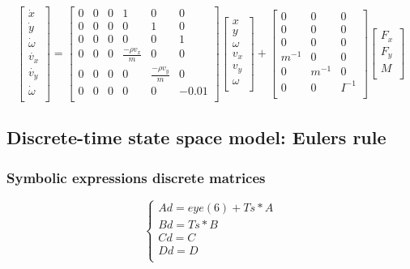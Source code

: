 \begin{equation}
\begin{bmatrix}
\dot{x} \\
\dot{y} \\
\dot{\omega} \\
\dot{v_x} \\
\dot{v_y} \\
\dot{\omega} \\
\end{bmatrix}
=
\begin{bmatrix}
0 & 0 & 0 & 1 & 0 & 0 \\
0 & 0 & 0 & 0 & 1 & 0 \\
0 & 0 & 0 & 0 & 0 & 1 \\
0 & 0 & 0 & \frac{-\rho v_x}{m} & 0 & 0 \\
0 & 0 & 0 & 0 &\frac{-\rho v_y}{m} & 0 \\
0 & 0 & 0 & 0 & 0 & -0.01 \\
\end{bmatrix}
\begin{bmatrix}
x \\
y \\
\omega \\
v_x \\
v_y \\
\omega \\
\end{bmatrix}
+
\begin{bmatrix}
0 & 0 & 0 \\
0 & 0 & 0 \\
0 & 0 & 0 \\
m^{-1} & 0 & 0 \\
0 & m^{-1} & 0 \\
0 & 0 & I^{-1} \\
\end{bmatrix}
\begin{bmatrix}
F_x \\
F_y \\
M \\
\end{bmatrix}
\label{eq:full statepace model goalkeeper}
\end{equation}

\subsection{Discrete-time state space model: Eulers rule}

\subsubsection{Symbolic expressions discrete matrices}
\begin{equation}
	\begin{cases}
		Ad = eye(6) + Ts*A \\
		Bd = Ts*B \\
		Cd = C \\
		Dd = D \\
	\end{cases}
\end{equation}


